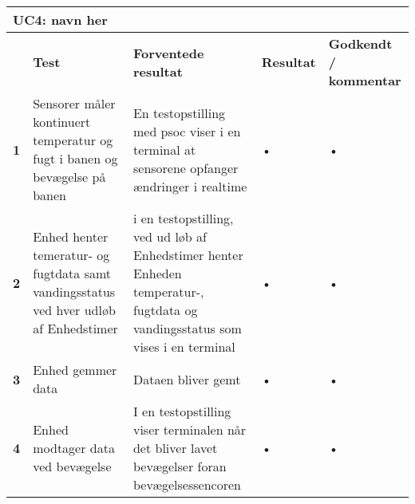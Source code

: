 
\begin{longtable}{|p{5mm}|p{40mm}|p{40mm}|p{20mm}|p{25mm}|}
\hline 
\multicolumn{5}{|l|}{\textbf{UC4: navn her}} \\ 
\hline 
& \textbf{Test} & \textbf{Forventede resultat} & \textbf{Resultat} & \textbf{Godkendt / kommentar} \\ 
\hline 
\textbf{1}& Sensorer måler kontinuert temperatur og fugt i banen og bevægelse på banen & En testopstilling med psoc viser i en terminal at sensorene opfanger ændringer i realtime & • & • \\ 
\hline 
\textbf{2}& Enhed henter temeratur- og fugtdata samt vandingsstatus ved hver udløb af Enhedstimer & i en testopstilling, ved ud løb af Enhedstimer henter Enheden temperatur-, fugtdata og vandingsstatus som vises i en terminal  & • & • \\ 
\hline 
\textbf{3}& Enhed gemmer data & Dataen bliver gemt & • & • \\ 
\hline 
\textbf{4}& Enhed modtager data ved bevægelse & I en testopstilling viser terminalen når det bliver lavet bevægelser foran bevægelsessencoren & • & • \\ 
\hline 
\end{longtable} 